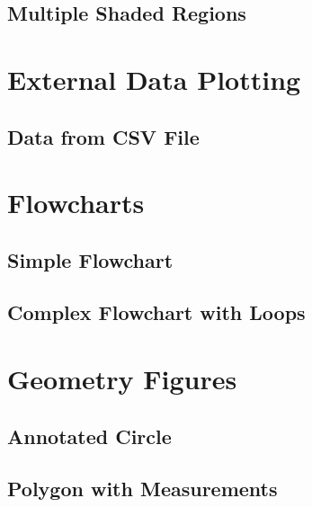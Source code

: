 \documentclass{beamer}
\begin{document}
\subsection{Multiple Shaded Regions}



\section{External Data Plotting}
\subsection{Data from CSV File}



\section{Flowcharts}
\subsection{Simple Flowchart}

\subsection{Complex Flowchart with Loops}



\section{Geometry Figures}
\subsection{Annotated Circle}

\subsection{Polygon with Measurements}


\end{document}
